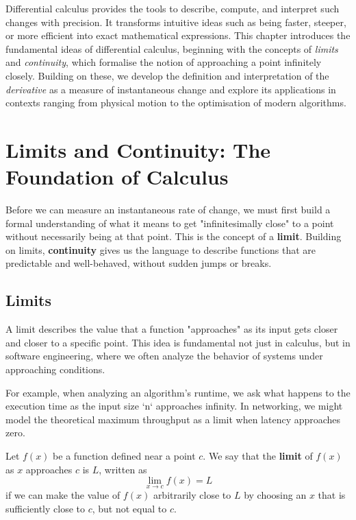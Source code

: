 Differential calculus provides the tools to describe, compute, and interpret such changes with precision. It transforms intuitive ideas such as being faster, steeper, or more efficient into exact mathematical expressions. This chapter introduces the fundamental ideas of differential calculus, beginning with the concepts of \emph{limits} and \emph{continuity}, which formalise the notion of approaching a point infinitely closely. Building on these, we develop the definition and interpretation of the \emph{derivative} as a measure of instantaneous change and explore its applications in contexts ranging from physical motion to the optimisation of modern algorithms.


\section{Limits and Continuity: The Foundation of Calculus}

Before we can measure an instantaneous rate of change, we must first build a formal understanding of what it means to get "infinitesimally close" to a point without necessarily being at that point. This is the concept of a \textbf{limit}. Building on limits, \textbf{continuity} gives us the language to describe functions that are predictable and well-behaved, without sudden jumps or breaks.

\subsection*{Limits}

A limit describes the value that a function "approaches" as its input gets closer and closer to a specific point. This idea is fundamental not just in calculus, but in software engineering, where we often analyze the behavior of systems under approaching conditions.

For example, when analyzing an algorithm's runtime, we ask what happens to the execution time as the input size `n` approaches infinity. In networking, we might model the theoretical maximum throughput as a limit when latency approaches zero.

\begin{definition}[Limit]
Let \( f(x) \) be a function defined near a point \( c \). We say that the \textbf{limit} of \( f(x) \) as \( x \) approaches \( c \) is \( L \), written as
\vspace{0.5em}
\[
\lim_{x \to c} f(x) = L
\]
\vspace{0.5em}
if we can make the value of \( f(x) \) arbitrarily close to \( L \) by choosing an \( x \) that is sufficiently close to \( c \), but not equal to \( c \).
\end{definition}

